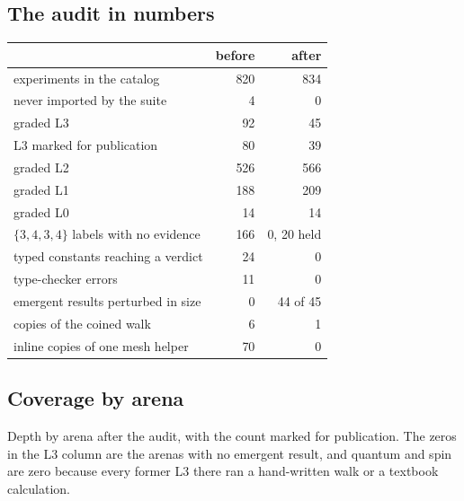 \subsection{The audit in numbers}

\begin{center}
\begin{tabular}{@{}lrr@{}}
\toprule
 & before & after \\
\midrule
experiments in the catalog & 820 & 834 \\
never imported by the suite & 4 & 0 \\
graded L3 & 92 & 45 \\
L3 marked for publication & 80 & 39 \\
graded L2 & 526 & 566 \\
graded L1 & 188 & 209 \\
graded L0 & 14 & 14 \\
$\{3,4,3,4\}$ labels with no evidence & 166 & 0, 20 held \\
typed constants reaching a verdict & 24 & 0 \\
type-checker errors & 11 & 0 \\
emergent results perturbed in size & 0 & 44 of 45 \\
copies of the coined walk & 6 & 1 \\
inline copies of one mesh helper & 70 & 0 \\
\bottomrule
\end{tabular}
\end{center}

\subsection{Coverage by arena}

Depth by arena after the audit, with the count marked for publication. The zeros in the L3 column are the arenas
with no emergent result, and quantum and spin are zero because every former L3 there ran a hand-written walk or a
textbook calculation.

